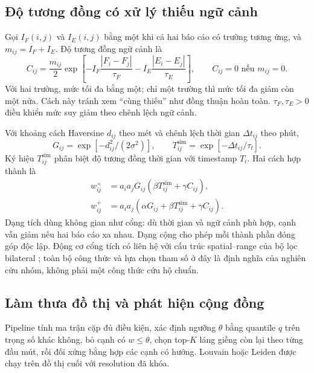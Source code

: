 \subsection{Độ tương đồng có xử lý thiếu ngữ cảnh}
Gọi $I_F(i,j)$ và $I_E(i,j)$ bằng một khi cả hai báo cáo có trường tương ứng, và $m_{ij}=I_F+I_E$. Độ tương đồng ngữ cảnh là
\begin{equation}
 C_{ij}=\frac{m_{ij}}{2}\exp\!\left[-I_F\frac{|F_i-F_j|}{\tau_F}
                                  -I_E\frac{|E_i-E_j|}{\tau_E}\right],
 \qquad C_{ij}=0\text{ nếu }m_{ij}=0.
 \label{eq:context-report}
\end{equation}
Với hai trường, mức tối đa bằng một; chỉ một trường thì mức tối đa giảm còn một nửa. Cách này tránh xem ``cùng thiếu'' như đồng thuận hoàn toàn. $\tau_F,\tau_E>0$ điều khiển mức suy giảm theo chênh lệch ngữ cảnh.

Với khoảng cách Haversine $d_{ij}$ theo mét và chênh lệch thời gian $\Delta t_{ij}$ theo phút,
\begin{equation}
 G_{ij}=\exp[-d_{ij}^{2}/(2\sigma^2)],\qquad
 T_{ij}^{\mathrm{sim}}=\exp[-\Delta t_{ij}/\tau_t].
 \label{eq:geo-time}
\end{equation}
Ký hiệu $T_{ij}^{\mathrm{sim}}$ phân biệt độ tương đồng thời gian với timestamp $T_i$. Hai cách hợp thành là
\begin{align}
 w_{ij}^{\times}&=a_ia_jG_{ij}(\beta T_{ij}^{\mathrm{sim}}+\gamma C_{ij}),\label{eq:product-graph}\\
 w_{ij}^{+}&=a_ia_j(\alpha G_{ij}+\beta T_{ij}^{\mathrm{sim}}+\gamma C_{ij}).\label{eq:additive-graph}
\end{align}
Dạng tích dùng không gian như cổng: dù thời gian và ngữ cảnh phù hợp, cạnh vẫn giảm nếu hai báo cáo xa nhau. Dạng cộng cho phép mỗi thành phần đóng góp độc lập. Động cơ cổng tích có liên hệ với cấu trúc spatial--range của bộ lọc bilateral \citep{tomasi1998bilateral}; toàn bộ công thức và lựa chọn tham số ở đây là định nghĩa của nghiên cứu nhóm, không phải một công thức cứu hộ chuẩn.

\subsection{Làm thưa đồ thị và phát hiện cộng đồng}
Pipeline tính ma trận cặp đủ điều kiện, xác định ngưỡng $\theta$ bằng quantile $q$ trên trọng số khác không, bỏ cạnh có $w\leq\theta$, chọn top-$K$ láng giềng còn lại theo từng đầu mút, rồi đối xứng bằng hợp các cạnh có hướng. Louvain hoặc Leiden được chạy trên đồ thị cuối với resolution đã khóa.

